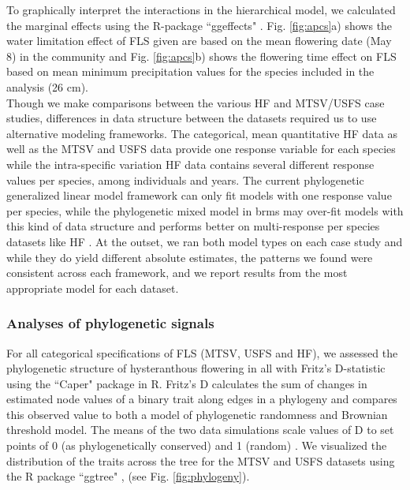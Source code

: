 \documentclass[11pt]{article}
\begin{document}
{%
\indent To graphically interpret the interactions in the hierarchical model, we calculated the marginal effects using the R-package ``ggeffects" \citep{Ludecke2018}. Fig. \ref{fig:apcs}a) shows the water limitation effect of FLS given are based on the mean flowering date (May 8) in the community and  Fig. \ref{fig:apcs}b) shows the flowering time effect on FLS based on mean minimum precipitation values for the species included in the analysis (26 cm). \\

\noindent Though we make comparisons between the various HF and MTSV/USFS case studies, differences in data structure between the datasets required us to use alternative modeling frameworks. The categorical, mean quantitative HF data as well as the MTSV and USFS data provide one response variable for each species while the intra-specific variation HF data contains several different response values per species, among individuals and years. The current phylogenetic generalized linear model framework can only fit models with one response value per species, while the phylogenetic mixed model in brms may over-fit models with this kind of data structure and performs better on multi-response per species datasets like HF \citep{BurknerPC}. At the outset, we ran both model types on each case study and while they do yield different absolute estimates, the patterns we found were consistent across each framework, and we report results from the most appropriate model for each dataset.\\

\subsubsection*{Analyses of phylogenetic signals}
\noindent For all categorical specifications of FLS (MTSV, USFS and HF), we assessed the phylogenetic structure of hysteranthous flowering in all  with Fritz's D-statistic \citep{FRITZ2010} using the ``Caper" package \citep{Orme2013} in R. Fritz's D calculates the sum of changes in estimated node values of a binary trait along edges in a phylogeny and compares this observed value to both a model of phylogenetic randomness and Brownian threshold model. The means of the two data simulations scale values of D to set points of 0 (as phylogenetically conserved) and 1 (random)  \citep{Orme2013}. We visualized the distribution of the traits across the tree for the MTSV and USFS datasets using the R package ``ggtree" \citep{Yu2017}, (see Fig. \ref{fig:phylogeny}). 

}
\end{document}
